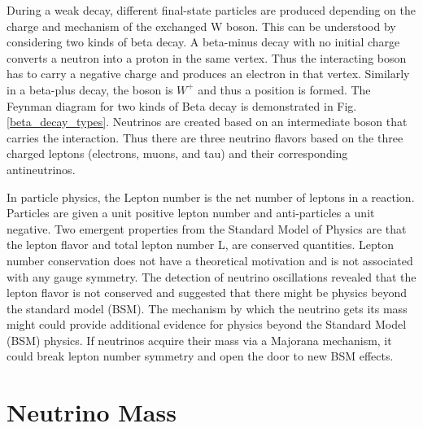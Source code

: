 
During a weak decay, different final-state particles are produced depending on the charge and mechanism of the exchanged W boson. This can be understood by considering two kinds of beta decay. A beta-minus decay with no initial charge converts a neutron into a proton in the same vertex. Thus the interacting boson has to carry a negative charge and produces an electron in that vertex. Similarly in a beta-plus decay, the boson is $W^+$ and thus a position is formed. The Feynman diagram for two kinds of Beta decay is demonstrated in Fig. \ref{beta_decay_types}. Neutrinos are created based on an intermediate boson that carries the interaction. Thus there are three neutrino flavors based on the three charged leptons (electrons, muons, and tau) and their corresponding antineutrinos. 




In particle physics, the Lepton number is the net number of leptons in a reaction. Particles are given a unit positive lepton number and anti-particles a unit negative. Two emergent properties from the Standard Model of Physics are that the lepton flavor and total lepton number L, are conserved quantities. Lepton number conservation does not have a theoretical motivation and is not associated with any gauge symmetry. The detection of neutrino oscillations revealed that the lepton flavor is not conserved and suggested that there might be physics beyond the standard model (BSM). The mechanism by which the neutrino gets its mass might could provide additional evidence for physics beyond the Standard Model (BSM) physics. If neutrinos acquire their mass via a Majorana mechanism, it could break lepton number symmetry and open the door to new BSM effects.

\section{Neutrino Mass}
